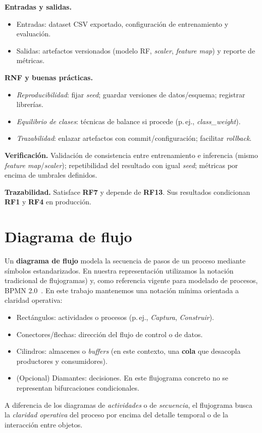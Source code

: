\textbf{Entradas y salidas.}
\begin{itemize}
  \item Entradas: dataset CSV exportado, configuración de entrenamiento y evaluación.
  \item Salidas: artefactos versionados (modelo RF, \emph{scaler}, \emph{feature map}) y reporte de métricas.
\end{itemize}

\textbf{RNF y buenas prácticas.}
\begin{itemize}
  \item \emph{Reproducibilidad}: fijar \emph{seed}; guardar versiones de datos/esquema; registrar librerías.
  \item \emph{Equilibrio de clases}: técnicas de balance si procede (p.\,ej., \emph{class\_weight}).
  \item \emph{Trazabilidad}: enlazar artefactos con commit/configuración; facilitar \emph{rollback}.
\end{itemize}

\textbf{Verificación.} Validación de consistencia entre entrenamiento e inferencia (mismo \emph{feature map}/\emph{scaler}); repetibilidad del resultado con igual \emph{seed}; métricas por encima de umbrales definidos.

\textbf{Trazabilidad.} Satisface \textbf{RF7} y depende de \textbf{RF13}. Sus resultados condicionan \textbf{RF1} y \textbf{RF4} en producción.

\section{Diagrama de flujo}
Un \textbf{diagrama de flujo} modela la secuencia de pasos de un proceso mediante símbolos estandarizados. En nuestra representación utilizamos la notación tradicional de flujogramas\cite{iso5807}) y, como referencia vigente para modelado de procesos, BPMN 2.0~\cite{iso19510bpmn}. En este trabajo mantenemos una notación mínima orientada a claridad operativa:
\begin{itemize}
  \item Rectángulos: actividades o procesos (p.\,ej., \emph{Captura}, \emph{Construir}).
  \item Conectores/flechas: dirección del flujo de control o de datos.
  \item Cilindros: almacenes o \emph{buffers} (en este contexto, una \textbf{cola} que desacopla productores y consumidores).
  \item (Opcional) Diamantes: decisiones. En este flujograma concreto no se representan bifurcaciones condicionales.
\end{itemize}
A diferencia de los diagramas de \emph{actividades} o de \emph{secuencia}, el flujograma busca la \emph{claridad operativa} del proceso por encima del detalle temporal o de la interacción entre objetos.

